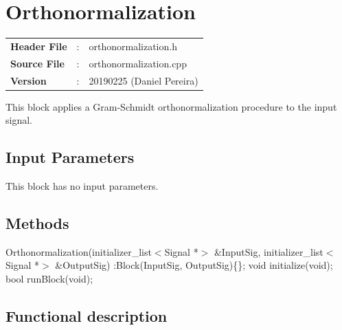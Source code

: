 \clearpage

\section{Orthonormalization}

\begin{refsection}

\begin{tcolorbox}	
	\begin{tabular}{p{2.75cm} p{0.2cm} p{10.5cm}} 	
		\textbf{Header File}   &:& orthonormalization.h \\
		\textbf{Source File}   &:& orthonormalization.cpp \\
        \textbf{Version}       &:& 20190225 (Daniel Pereira)\\
	\end{tabular}
\end{tcolorbox}

This block applies a Gram-Schmidt orthonormalization procedure to the input signal.

\subsection*{Input Parameters}

This block has no input parameters.

\subsection*{Methods}

Orthonormalization(initializer\_list$<$Signal *$>$ \&InputSig, initializer\_list$<$Signal *$>$ \&OutputSig) :Block(InputSig, OutputSig)\{\};
\bigbreak
void initialize(void);
\bigbreak
bool runBlock(void);

\subsection*{Functional description}


\end{refsection}
